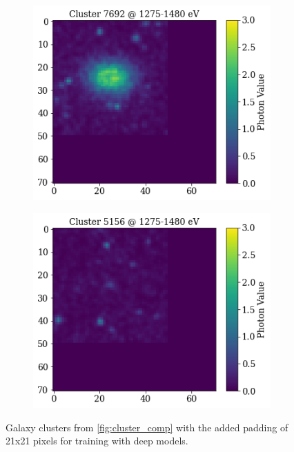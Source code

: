 \begin{figure}[H]
\centering
\begin{subfigure}{.4\textwidth}
  \centering
  \includegraphics[width=\linewidth]{images/Chapter3/cluster_big_padded.png}
  \label{fig:cluster_big_padded}
\end{subfigure}%
\hspace{3.6em}
\begin{subfigure}{.4\textwidth}
  \centering
  \includegraphics[width=\linewidth]{images/Chapter3/cluster_small_padded.png}
  \label{fig:cluster_small_padded}
\end{subfigure}
\caption{Galaxy clusters from \autoref{fig:cluster_comp} with the added padding of 21x21 pixels for training with deep models.} 
\label{fig:cluster_comp_padded}
\end{figure}

